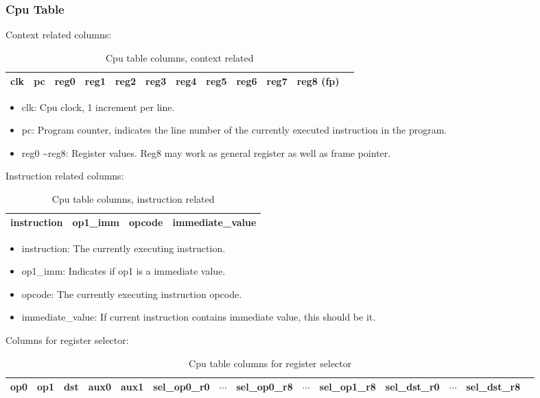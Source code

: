 \subsubsection{Cpu Table} \label{sec:cpu-table}

Context related columns:
\begin{table}[!ht]
    \centering
    \begin{tabular}{|c|c|c|c|c|c|c|c|c|c|c|c|}
        \hline
        clk & pc & reg0 & reg1 & reg2 & reg3 & reg4 & reg5 & reg6 & reg7 & reg8 (fp) \\
        \hline
    \end{tabular}
    \caption{Cpu table columns, context related}
    \label{table:cpu-columns-context}
\end{table}

\begin{itemize}
    \item clk: Cpu clock, 1 increment per line.
    \item pc: Program counter, indicates the line number of the currently executed instruction in the program.
    \item reg0 \textasciitilde reg8: Register values. Reg8 may work as general register as well as frame pointer.
\end{itemize}

Instruction related columns:
\begin{table}[!ht]
    \centering
    \begin{tabular}{|c|c|c|c|}
        \hline
        instruction & op1\_imm & opcode & immediate\_value \\
        \hline
    \end{tabular}
    \caption{Cpu table columns, instruction related}
    \label{table:cpu-columns-instruction}
\end{table}

\begin{itemize}
    \item instruction: The currently executing instruction.
    \item op1\_imm: Indicates if op1 is a immediate value.
    \item opcode: The currently executing instruction opcode.
    \item immediate\_value: If current instruction contains immediate value, this should be it.
\end{itemize}

Columns for register selector:
\begin{table}[!ht]
    \centering
    \begin{tabular}{|c|c|c|c|c|c|c|c|c|c|c|c|c|c|}
        \hline
        op0 & op1 & dst & aux0 & aux1 & sel\_op0\_r0 & $\cdots$ & sel\_op0\_r8 & $\cdots$ & sel\_op1\_r8 & sel\_dst\_r0 & $\cdots$ & sel\_dst\_r8 \\
        \hline
    \end{tabular}
    \caption{Cpu table columns for register selector}
    \label{table:cpu-columns-reg-selector}
\end{table}

